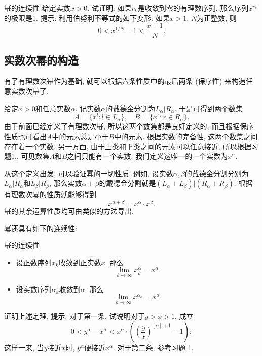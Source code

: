 \begin{exercise}{幂的连续性}
给定实数$x>0$. 试证明: 如果$r_k$是收敛到零的有理数序列, 那么序列$x^{r_k}$的极限是1. 提示: 利用伯努利不等式的如下变形: 如果$x>1$, $N$为正整数, 则
\[
0<x^{1/N}-1<\frac{x-1}{N}.
\]
\end{exercise}

\subsection{实数次幂的构造}
有了有理数次幂作为基础, 就可以根据六条性质中的最后两条 (保序性) 来构造任意实数次幂了. 

给定$x>0$和任意实数$\alpha$. 记实数$\alpha$的戴德金分割为$L_\alpha|R_\alpha$. 于是可得到两个数集
\[
A=\{x^l:l\in L_\alpha\},\quad B=\{x^r:r\in R_\alpha\}.
\]
由于前面已经定义了有理数次幂, 所以这两个数集都是良好定义的, 而且根据保序性质也可看出$A$中的元素总是小于$B$中的元素. 根据实数的完备性, 这两个数集之间存在着一个实数. 另一方面, 由于上类和下类之间的元素可以任意接近, 所以根据习题1., 可见数集$A$和$B$之间只能有一个实数. 我们定义这唯一的一个实数为$x^\alpha$.

从这个定义出发, 可以验证幂的一切性质. 例如, 设实数$\alpha,\beta$的戴德金分割分别为$L_\alpha|R_\alpha$和$L_\beta|R_\beta$, 那么实数$\alpha+\beta$的戴德金分割就是$(L_\alpha+L_\beta)|(R_\alpha+R_\beta)$. 根据有理数次幂的性质就能够得到
\[
x^{\alpha+\beta}=x^\alpha\cdot x^\beta.
\]
幂的其余运算性质均可由类似的方法导出.

幂还具有如下的连续性:

\begin{theorem}{幂的连续性}
\begin{itemize}
\item 设正数序列$x_k$收敛到正实数$x$. 那么
\[
\lim_{k\to\infty}x_k^\alpha=x^\alpha.
\]
\item 设实数序列$\alpha_k$收敛到$\alpha$. 那么
\[
\lim_{k\to\infty}x^{\alpha_k}=x^\alpha.
\]
\end{itemize}
\end{theorem}

\begin{exercise}{}
证明上述定理. 提示: 对于第一条, 试说明对于$y>x>1$, 成立
\[
0<y^\alpha-x^\alpha<x^\alpha\cdot\left(\left(\frac{y}{x}\right)^{[\alpha]+1}-1\right);
\]
这样一来, 当$y$接近$x$时, $y^\alpha$便接近$x^\alpha$. 对于第二条, 参考习题 1.
\end{exercise}

